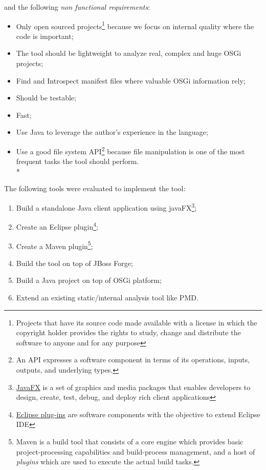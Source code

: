 and the following \emph{non functional requirements}:

\begin{itemize}
\item Only open sourced projects\footnote{Projects that have its source code made available with a license in which the copyright holder provides the rights to study, change and distribute the software to anyone and for any purpose} because we focus on internal quality where the code is important;
\item The tool should be lightweight to analyze real, complex and huge OSGi projects;
\item Find and Introspect manifest files where valuable OSGi information rely; 
\item Should be testable;
\item Fast;
\item Use Java to leverage the author's experience in the language;
\item Use a good file system API\footnote{An API expresses a software component in terms of its operations, inputs, outputs, and underlying types.} because file manipulation is one of the most frequent tasks the tool should perform.\\*
\end{itemize}
 

The following tools were evaluated to implement the tool:

\begin{enumerate}
\item Build a standalone Java client application using javaFX\footnote{\href{http://docs.oracle.com/javase/8/javase-clienttechnologies.htm}{JavaFX} is a set of graphics and media packages that enables developers to design, create, test, debug, and deploy rich client applications};
\item Create an Eclipse plugin\footnote{\href{https://wiki.eclipse.org/FAQ_What_is_a_plug-in\%3F}{Eclipse plug-ins} are software components with the objective to extend Eclipse IDE};
\item Create a  Maven plugin\footnote{Maven is a build tool that consists of a core engine which provides basic project-processing capabilities and build-process management, and a host of \emph{plugins} which are used to execute the actual build tasks.};
\item Build the tool on top of JBoss Forge;
\item Build a Java project on top of OSGi platform; 
\item Extend an existing static/internal analysis tool like PMD.
\end{enumerate}

